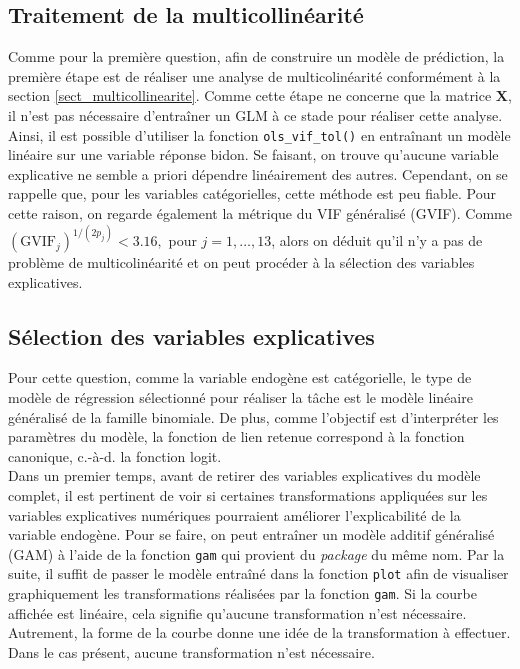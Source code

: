 \documentclass{article}
\begin{document}
	\subsection{Traitement de la multicollinéarité}\label{sect_qst2_vif}
	Comme pour la première question, afin de construire un modèle de prédiction, la première étape est de réaliser une analyse de multicolinéarité conformément à la section \ref{sect_multicollinearite}.
	Comme cette étape ne concerne que la matrice $\boldsymbol{X}$, il n'est pas nécessaire d'entraîner un GLM à ce stade pour réaliser cette analyse. Ainsi, il est possible d'utiliser la fonction \texttt{ols\_vif\_tol()} en entraînant un modèle linéaire sur une variable réponse bidon. Se faisant, on trouve qu'aucune variable explicative ne semble a priori dépendre linéairement des autres. Cependant, on se rappelle que, pour les variables catégorielles, cette méthode est peu fiable. Pour cette raison, on regarde également la métrique du VIF généralisé (GVIF). Comme
	$(\mathrm{GVIF}_j)^{1/(2 p_j)} < 3.16,$ pour $j=1,\dots,13$, alors on déduit qu'il n'y a pas de problème de multicolinéarité et on peut procéder à la sélection des variables explicatives.


	\subsection{Sélection des variables explicatives}\label{sect_qst2_selection_variables}	
	Pour cette question, comme la variable endogène est catégorielle, le type de modèle de régression sélectionné pour réaliser la tâche est le modèle linéaire généralisé de la famille binomiale. De plus, comme l'objectif est d'interpréter les paramètres du modèle, la fonction de lien retenue correspond à la fonction canonique, c.-à-d. la fonction logit.\\
	
	Dans un premier temps, avant de retirer des variables explicatives du modèle complet, il est pertinent de voir si certaines transformations appliquées sur les variables explicatives numériques pourraient améliorer l'explicabilité de la variable endogène. Pour se faire, on peut entraîner un modèle additif généralisé (GAM) à l'aide de la fonction \texttt{gam} qui provient du \textit{package} du même nom. Par la suite, il suffit de passer le modèle entraîné dans la fonction \texttt{plot} afin de visualiser graphiquement les transformations réalisées par la fonction \texttt{gam}. Si la courbe affichée est linéaire, cela signifie qu'aucune transformation n'est nécessaire. Autrement, la forme de la courbe donne une idée de la transformation à effectuer. Dans le cas présent, aucune transformation n'est nécessaire.\\
\end{document}
